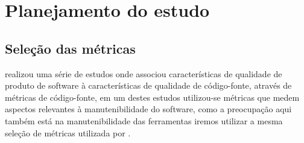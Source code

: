 \documentclass[qual, classic, a4paper]{ufbathesis}
\begin{document}
\section{Planejamento do estudo}

\subsection{Seleção das métricas}

 realizou uma série de estudos onde associou
características de qualidade de produto de software à características de
qualidade de código-fonte, através de métricas de código-fonte, em um destes estudos
utilizou-se métricas que medem aspectos relevantes à manutenibilidade do
software, como a preocupação aqui também está na manutenibilidade
das ferramentas iremos utilizar a mesma seleção de métricas utilizada por
.
\end{document}
